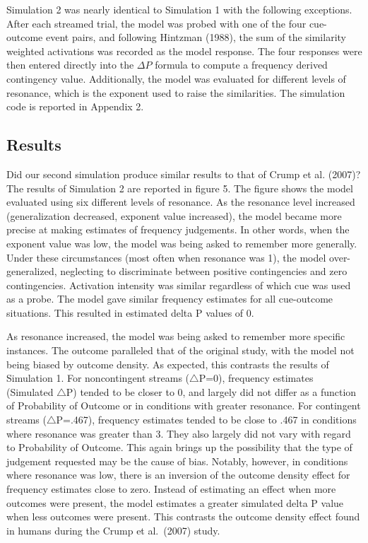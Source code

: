 \documentclass[
  english,
  man,floatsintext]{apa6}
\begin{document}
Simulation 2 was nearly identical to Simulation 1 with the following exceptions. After each streamed trial, the model was probed with one of the four cue-outcome event pairs, and following Hintzman (1988), the sum of the similarity weighted activations was recorded as the model response. The four responses were then entered directly into the \(\Delta P\) formula to compute a frequency derived contingency value. Additionally, the model was evaluated for different levels of resonance, which is the exponent used to raise the similarities. The simulation code is reported in Appendix 2.

\hypertarget{results-1}{%
\subsection{Results}\label{results-1}}

Did our second simulation produce similar results to that of Crump et al. (2007)? The results of Simulation 2 are reported in figure 5. The figure shows the model evaluated using six different levels of resonance. As the resonance level increased (generalization decreased, exponent value increased), the model became more precise at making estimates of frequency judgements. In other words, when the exponent value was low, the model was being asked to remember more generally. Under these circumstances (most often when resonance was 1), the model over-generalized, neglecting to discriminate between positive contingencies and zero contingencies. Activation intensity was similar regardless of which cue was used as a probe. The model gave similar frequency estimates for all cue-outcome situations. This resulted in estimated delta P values of 0.

As resonance increased, the model was being asked to remember more specific instances. The outcome paralleled that of the original study, with the model not being biased by outcome density. As expected, this contrasts the results of Simulation 1. For noncontingent streams (\(\triangle\)P=0), frequency estimates (Simulated \(\triangle\)P) tended to be closer to 0, and largely did not differ as a function of Probability of Outcome or in conditions with greater resonance. For contingent streams (\(\triangle\)P=.467), frequency estimates tended to be close to .467 in conditions where resonance was greater than 3. They also largely did not vary with regard to Probability of Outcome. This again brings up the possibility that the type of judgement requested may be the cause of bias. Notably, however, in conditions where resonance was low, there is an inversion of the outcome density effect for frequency estimates close to zero. Instead of estimating an effect when more outcomes were present, the model estimates a greater simulated delta P value when less outcomes were present. This contrasts the outcome density effect found in humans during the Crump et al.~(2007) study.
\end{document}
